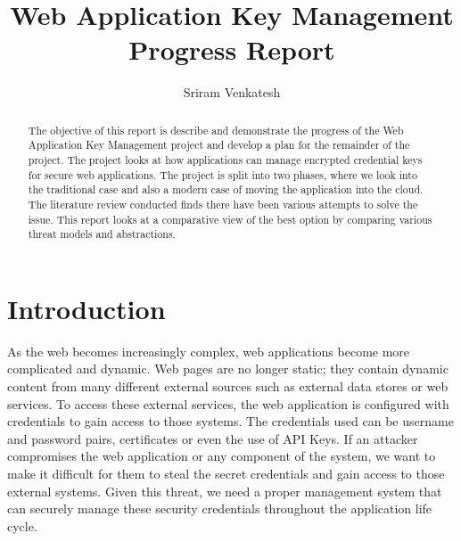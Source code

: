 \documentclass[11pt, a4paper, notitlepage]{article}
\title{Web Application Key Management Progress Report}
\author{Sriram Venkatesh}
\date{}
\begin{document}
\frontmatter


\begin{abstract}
The objective of this report is describe and demonstrate the progress of the Web Application Key Management project and develop a plan for the remainder of the project. The project looks at how applications can manage encrypted credential keys for secure web applications. The project is split into two phases, where we look into the traditional case and also a modern case of moving the application into the cloud. The literature review conducted finds there have been various attempts to solve the issue. This report looks at a comparative view of the best option by comparing various threat models and abstractions. 
\end{abstract}


\maketitle




\mainmatter


\section{Introduction}
As the web becomes increasingly complex, web applications become more complicated and dynamic. Web pages are no longer static; they contain dynamic content from many different external sources such as external data stores or web services. To access these external services, the web application is configured with credentials to gain access to those systems. The credentials used can be username and password pairs, certificates or even the use of API Keys. If an attacker compromises the web application or any component of the system, we want to make it difficult for them to steal the secret credentials and gain access to those external systems. Given this threat, we need a proper management system that can securely manage these security credentials throughout the application life cycle. \\
\end{document}
